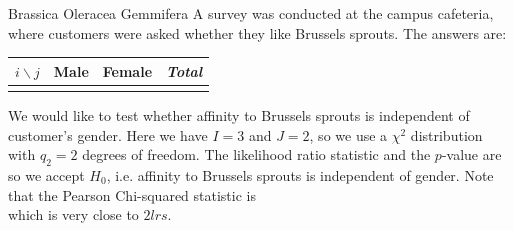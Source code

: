  \begin{ex}{Brassica Oleracea Gemmifera} A survey was conducted at the campus cafeteria, where customers were asked whether
 they like Brussels sprouts. The answers are:
 \begin{center}
 \begin{tabular}{|c|c c c c||c c|}
 \hline
   $i\backslash j$  & \multicolumn{2}{c}{Male}& \multicolumn{2}{c||}{Female} &\multicolumn{2}{c|}{\emph{Total}} \\ \hline
   \\ %
 \hline
 \end{tabular}
 \end{center} We would like to test whether affinity to Brussels sprouts
 is independent of customer's gender.
%
 Here we have $I=3$ and $J=2$, so we use a $\chi^2$ distribution with $q_2=2$
 degrees of freedom. The likelihood ratio statistic and the $p$-value are
  \\
so we accept $H_0$, i.e. affinity to Brussels sprouts is independent of gender.
%
Note that the Pearson Chi-squared statistic is
  \\
  which is very close to $2 lrs$. \end{ex}
